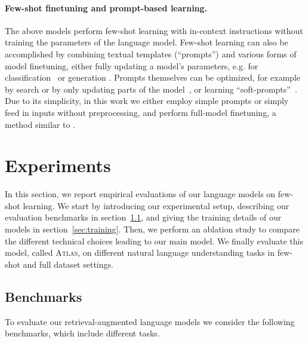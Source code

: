 \documentclass[10pt]{article} \usepackage[preprint]{tmlr}
\newcommand{\Atlas}{\textsc{Atlas}}
\begin{document}
\paragraph{Few-shot finetuning and prompt-based learning.}
The above models perform few-shot learning with in-context instructions without training the parameters of the language model.
Few-shot learning can also be accomplished by combining textual templates (``prompts'') and various forms of model finetuning, either fully updating a model's parameters, e.g. for classification~\citep{schick2021classification,Schick2021ItsNJ,gao-etal-2021-making,Tam2021ImprovingAS} or generation \citep{schick2021generation}.
Prompts themselves can be optimized, for example by search \citep{jiang-etal-2020-know, shin-etal-2020-autoprompt} or by only updating parts of the model~\citep{RobertLLogan2021CuttingDO}, or learning ``soft-prompts''~\citep{prompt_tuning,li-liang-2021-prefix}.
Due to its simplicity, in this work we either employ simple prompts or simply feed in inputs without preprocessing, and perform full-model finetuning, a method similar to \citet{le-scao-rush-2021-many}.

\section{Experiments}
In this section, we report empirical evaluations of our language models on few-shot learning.
We start by introducing our experimental setup, describing our evaluation benchmarks in section~\ref{sec:benchmarks}, and giving the training details of our models in section~\ref{sec:training}.
Then, we perform an ablation study to compare the different technical choices leading to our main model.
We finally evaluate this model, called \Atlas, on different natural language understanding tasks in few-shot and full dataset settings.

\subsection{Benchmarks}
\label{sec:benchmarks}
To evaluate our retrieval-augmented language models we consider the following benchmarks, which include different tasks.
\end{document}
